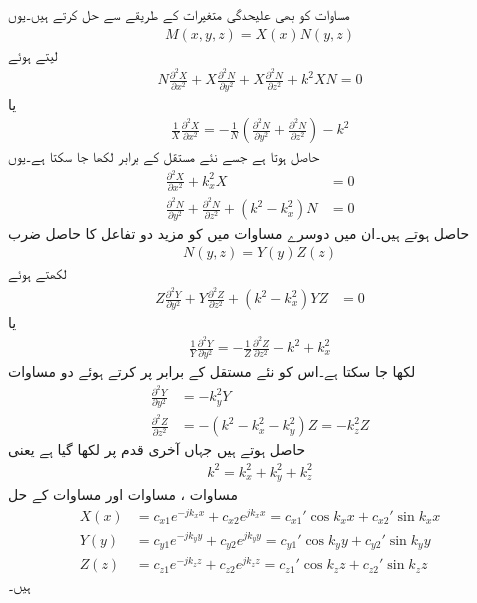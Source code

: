 مساوات  کو بھی علیحدگی متغیرات کے طریقے سے حل کرتے ہیں۔یوں
\begin{align}\label{مساوات_مویج_مستطیلی_گھمکی_علیحدگی_الف}
M(x,y,z)=X(x)N(y,z)
\end{align}
لیتے ہوئے
\begin{align*}
N\frac{\partial^2 X}{\partial x^2}+X\frac{\partial^2 N}{\partial y^2}+X\frac{\partial^2 N}{\partial z^2}+k^2 XN=0
\end{align*}
یا
\begin{align*}
\frac{1}{X}\frac{\partial^2 X}{\partial x^2}=-\frac{1}{N}\left(\frac{\partial^2 N}{\partial y^2}+\frac{\partial^2 N}{\partial z^2}\right)-k^2 
\end{align*}
حاصل ہوتا ہے جسے نئے مستقل  کے برابر لکھا جا سکتا ہے۔یوں 
\begin{align}
\frac{\partial^2 X}{\partial x^2}+k_x^2 X&=0 \label{مساوات_مویج_میکس_ویل_عمومی_الف}\\
\frac{\partial^2 N}{\partial y^2}+\frac{\partial^2 N}{\partial z^2}+(k^2 -k_x^2)N &=0
\end{align}
حاصل ہوتے ہیں۔ان میں دوسرے مساوات میں  کو مزید دو تفاعل کا حاصل ضرب
\begin{align}\label{مساوات_مویج_مستطیلی_گھمکی_علیحدگی_ب}
N(y,z)=Y(y)Z(z)
\end{align}
 لکھتے ہوئے
\begin{align*}
Z\frac{\partial^2 Y}{\partial y^2}+Y\frac{\partial^2 Z}{\partial z^2}+(k^2 -k_x^2)YZ &=0
\end{align*}
یا
\begin{align*}
\frac{1}{Y}\frac{\partial^2 Y}{\partial y^2}=-\frac{1}{Z}\frac{\partial^2 Z}{\partial z^2}-k^2 +k_x^2
\end{align*}
لکھا جا سکتا ہے۔اس کو نئے مستقل  کے برابر  پر کرتے ہوئے دو مساوات
\begin{align}
\frac{\partial^2 Y}{\partial y^2}&=-k_y^2 Y \label{مساوات_مویج_میکس_ویل_عمومی_ب}\\
\frac{\partial^2 Z}{\partial z^2}&=-(k^2 -k_x^2-k_y^2)Z=-k_z^2 Z \label{مساوات_مویج_میکس_ویل_عمومی_پ}
\end{align}
حاصل ہوتے ہیں جہاں آخری قدم پر  لکھا گیا ہے  یعنی
\begin{align}\label{مساوات_مویج_مستطیلی_گھمکی_علیحدگی_پ}
k^2 =k_x^2+k_y^2+k_z^2
\end{align}
مساوات ، مساوات  اور مساوات  کے حل
\begin{align}
X(x)&=c_{x1}e^{- j k_x x}+c_{x2}e^{ j k_x x}  = c_{x1}' \cos {k_x x}+c_{x2}' \sin {k_x x}\label{مساوات_مویج_گھمکی_عمومی_الف}\\
Y(y)&=c_{y1} e^{- j k_y y}+c_{y2} e^{ j k_y y}=c_{y1}' \cos{ k_y y}+c_{y2}' \sin{ k_y y}   \label{مساوات_مویج_گھمکی_عمومی_ب}\\
Z(z)&=c_{z1} e^{- j k_z z}+c_{z2} e^{j k_z z} =c_{z1}' \cos{  k_z z}+c_{z2}' \sin{ k_z z}  \label{مساوات_مویج_گھمکی_عمومی_پ}
\end{align}
ہیں۔


